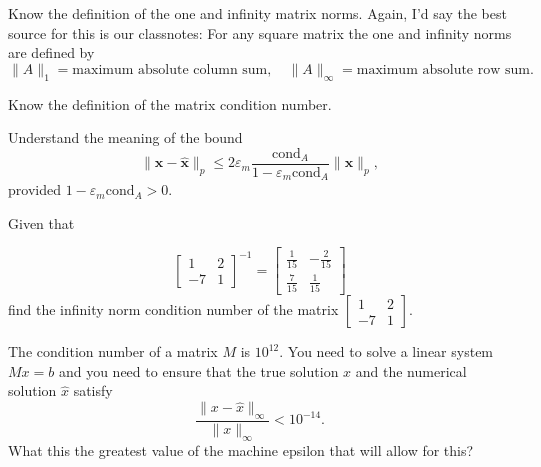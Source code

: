 \documentclass[12pt,fleqn]{exam}
\begin{document}
\begin{questions}
\begin{solution}
\end{solution}




\item Know the definition of the  one and infinity matrix norms. Again, I'd say the best source for this is our classnotes:   For any square matrix the one  and infinity norms are defined by
\begin{equation*}
   \| A \|_1 = \text{maximum absolute column sum}, \quad 
       \| A \|_\infty =  \text{maximum absolute row sum}.
\end{equation*}


 \item Know the definition of the matrix condition number.
 
 \item  Understand the meaning of the bound
 \begin{equation*}
   \| \mathbf{x} - \mathbf{\widehat x} \|_p \leq 2 \varepsilon_m \frac{\mbox{cond}_A}
   {1   - \varepsilon_m \mbox{cond}_A} \| \mathbf{x} \|_p,
   \end{equation*}
   provided \(1   - \varepsilon_m \mbox{cond}_A > 0 \).
   
    
    \question Given that 

\[
\begin{bmatrix}1 & 2\\
-7 & 1\end{bmatrix}^{-1} = \begin{bmatrix}\frac{1}{15} & -\frac{2}{15}\\
\frac{7}{15} & \frac{1}{15}\end{bmatrix}
\]
find the infinity norm condition number of the matrix \(\begin{bmatrix}1 & 2\\
-7 & 1\end{bmatrix}\).

\question The condition number of a matrix \(M\) is  \(10^{12}\).  You need to solve a linear system \(M x = b\) and you need to ensure that the true solution \(x\) and the numerical solution \(\widehat x\) satisfy
\[
     \frac{\| x - \widehat x \|_\infty} {\| x   \|_\infty} < 10^{-14}.
\]
What this the greatest value of the machine epsilon that will allow for this?


\end{questions}
\end{document}
